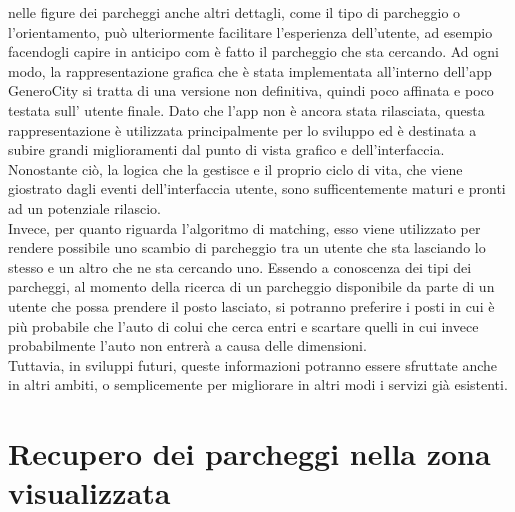 nelle figure dei parcheggi anche altri dettagli, come il tipo di parcheggio o 
l'orientamento, può ulteriormente facilitare l'esperienza dell'utente, ad esempio
facendogli capire in anticipo com è fatto il parcheggio che sta cercando.
Ad ogni modo, la rappresentazione grafica che è stata implementata all'interno
dell'app GeneroCity si tratta di una versione non definitiva, quindi poco affinata e poco
testata sull' utente finale. Dato che l'app non è ancora stata rilasciata, questa 
rappresentazione è utilizzata principalmente per lo sviluppo ed è destinata a subire
grandi miglioramenti dal punto di vista grafico e dell'interfaccia. Nonostante ciò,
la logica che la gestisce e il proprio ciclo di vita, che viene giostrato dagli eventi
dell'interfaccia utente, sono sufficentemente maturi e pronti ad un potenziale rilascio.\\
Invece, per quanto riguarda l'algoritmo di matching, esso viene utilizzato per 
rendere possibile uno scambio di parcheggio tra un utente che sta lasciando lo 
stesso e un altro che ne sta cercando uno. Essendo a conoscenza dei tipi dei 
parcheggi, al momento della ricerca di un parcheggio disponibile da parte di un
utente che possa prendere il posto lasciato, si potranno preferire i posti in cui
è più probabile che l'auto di colui che cerca entri e scartare quelli in cui invece
probabilmente l'auto non entrerà a causa delle dimensioni.\\
Tuttavia, in sviluppi futuri, queste informazioni potranno essere sfruttate anche in
altri ambiti, o semplicemente per migliorare in altri modi i servizi già esistenti.


\section{Recupero dei parcheggi nella zona visualizzata} 


